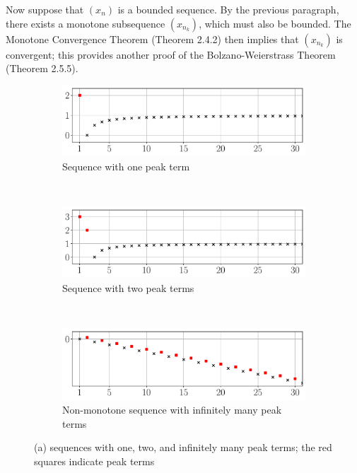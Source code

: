 \documentclass{lew98_solutions}
\begin{document}
\begin{solution}
\begin{enumerate}
        Now suppose that \( (x_n) \) is a bounded sequence. By the previous paragraph, there exists a monotone subsequence \( (x_{n_k}) \), which must also be bounded. The Monotone Convergence Theorem (Theorem 2.4.2) then implies that \( (x_{n_k}) \) is convergent; this provides another proof of the Bolzano-Weierstrass Theorem (Theorem 2.5.5).
    \end{enumerate}
    \begin{figure}[H]
        \centering
        \begin{subfigure}{0.8\textwidth}
            \includegraphics[width=\textwidth]{UA_Figures/UA_ex2_5_8_fig_a.pdf}
            \caption{Sequence with one peak term}
        \end{subfigure} \\
        \begin{subfigure}{0.8\textwidth}
            \includegraphics[width=\textwidth]{UA_Figures/UA_ex2_5_8_fig_b.pdf}
            \caption{Sequence with two peak terms}
        \end{subfigure} \\
        \begin{subfigure}{0.8\textwidth}
            \includegraphics[width=\textwidth]{UA_Figures/UA_ex2_5_8_fig_c.pdf}
            \caption{Non-monotone sequence with infinitely many peak terms}
        \end{subfigure}
        \caption{ (a) sequences with one, two, and infinitely many peak terms; the red squares indicate peak terms}
        \label{fig:ex2.5.8}
    \end{figure}
\end{solution}
\end{document}
